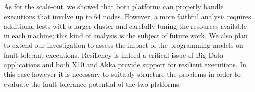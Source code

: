 \documentclass[a4paper]{article}
\numberwithin{equation}{section}
\begin{document}
As for the scale-out, 
we showed that both platforms can properly 
handle executions that involve up to 64 nodes. However, a more
faithful analysis requires additional tests with a larger cluster and
carefully tuning the resources available in each machine; this kind of
analysis is the subject of future work. 
We also plan to extend our investigation to assess the impact of the
programming models on fault tolerant executions. Resiliency is indeed
a critical issue of Big Data applications and both X10 and Akka
provide support for resilient executions.
In this case however it is necessary to suitably structure the
problems in order to evaluate the fault tolerance potential of the two
platforms.
\end{document}
